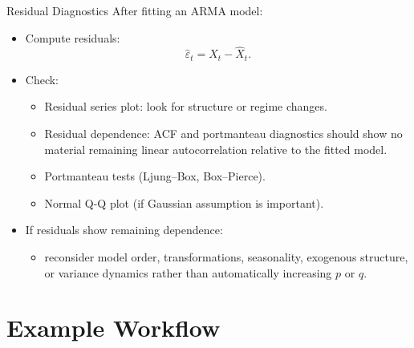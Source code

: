 \documentclass{beamer}
\begin{document}
\begin{frame}{Residual Diagnostics}
  After fitting an ARMA model:
  \begin{itemize}
    \item Compute residuals:
      \[
        \hat{\varepsilon}_t = X_t - \hat{X}_t.
      \]
    \item Check:
      \begin{itemize}
        \item Residual series plot: look for structure or regime changes.
        \item Residual dependence: ACF and portmanteau diagnostics should show no material remaining linear autocorrelation relative to the fitted model.
        \item Portmanteau tests (Ljung--Box, Box--Pierce).
        \item Normal Q-Q plot (if Gaussian assumption is important).
      \end{itemize}
    \item If residuals show remaining dependence:
      \begin{itemize}
        \item reconsider model order, transformations, seasonality, exogenous structure, or variance dynamics rather than automatically increasing $p$ or $q$.
      \end{itemize}
  \end{itemize}
\end{frame}

\section{Example Workflow}
\end{document}
